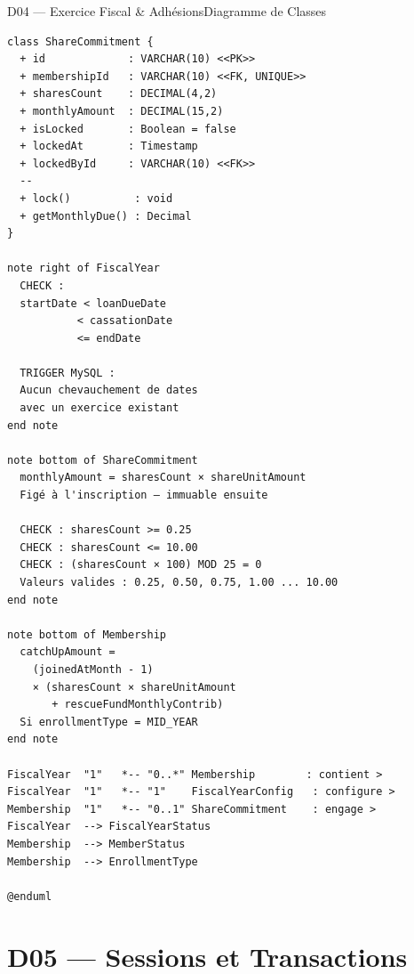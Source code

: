 \documentclass[12pt, a4paper]{report}
\begin{document}
\begin{diagramBox}{D04 — Exercice Fiscal \& Adhésions}{Diagramme de Classes}
\begin{lstlisting}
class ShareCommitment {
  + id             : VARCHAR(10) <<PK>>
  + membershipId   : VARCHAR(10) <<FK, UNIQUE>>
  + sharesCount    : DECIMAL(4,2)
  + monthlyAmount  : DECIMAL(15,2)
  + isLocked       : Boolean = false
  + lockedAt       : Timestamp
  + lockedById     : VARCHAR(10) <<FK>>
  --
  + lock()          : void
  + getMonthlyDue() : Decimal
}

note right of FiscalYear
  CHECK :
  startDate < loanDueDate
           < cassationDate
           <= endDate

  TRIGGER MySQL :
  Aucun chevauchement de dates
  avec un exercice existant
end note

note bottom of ShareCommitment
  monthlyAmount = sharesCount × shareUnitAmount
  Figé à l'inscription — immuable ensuite

  CHECK : sharesCount >= 0.25
  CHECK : sharesCount <= 10.00
  CHECK : (sharesCount × 100) MOD 25 = 0
  Valeurs valides : 0.25, 0.50, 0.75, 1.00 ... 10.00
end note

note bottom of Membership
  catchUpAmount =
    (joinedAtMonth - 1)
    × (sharesCount × shareUnitAmount
       + rescueFundMonthlyContrib)
  Si enrollmentType = MID_YEAR
end note

FiscalYear  "1"   *-- "0..*" Membership        : contient >
FiscalYear  "1"   *-- "1"    FiscalYearConfig   : configure >
Membership  "1"   *-- "0..1" ShareCommitment    : engage >
FiscalYear  --> FiscalYearStatus
Membership  --> MemberStatus
Membership  --> EnrollmentType

@enduml
\end{lstlisting}
\end{diagramBox}

\section{D05 — Sessions et Transactions}
\end{document}
